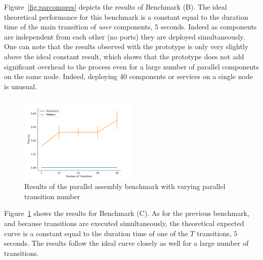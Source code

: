 Figure~\ref{fig:parcompres} depicts the results of Benchmark (B). The
ideal theoretical performance for this benchmark is a constant equal
to the duration time of the main transition of \emph{user} components,
\ie $5$ seconds. Indeed as components are independent from each other
(no ports) they are deployed simultaneously.
One can note that the results observed with the \mad prototype is only
very slightly above the ideal constant result, which shows that the
prototype does not add significant overhead to the process even for a
large number of parallel components on the same node. Indeed,
deploying 40 components or services on a single node is unusual.

\begin{figure}[h]
  \begin{center} 
    \includegraphics[width=0.5\textwidth]{./images/evaluations_par_transitions.pdf}
    \caption{Results of the parallel assembly benchmark with varying parallel transition number}
    \label{fig:partrans}
  \end{center}
\end{figure}

Figure~\ref{fig:partrans} shows the results for Benchmark (C). As for
the previous benchmark, and because transitions are executed
simultaneously, the theoretical expected curve is a
constant equal to the duration time of one of the $T$ transitions, \ie
$5$ seconds. The results follow the ideal curve closely as well for a
large number of transitions.


